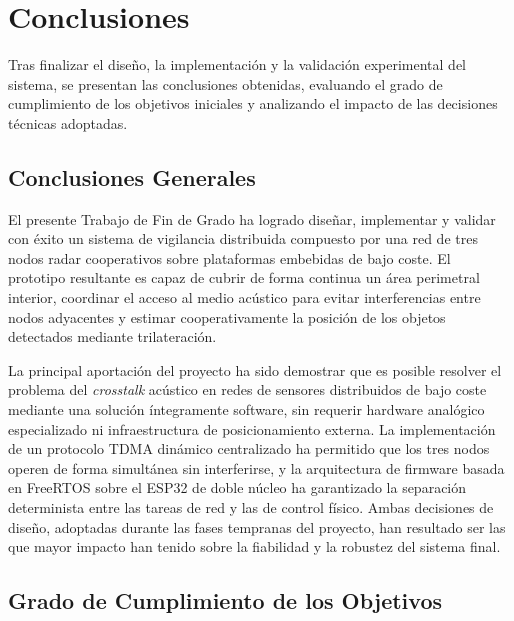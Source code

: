 \chapter{Conclusiones}
\label{chap:conclusiones}

Tras finalizar el diseño, la implementación y la validación experimental del sistema, se presentan las conclusiones obtenidas, evaluando el grado de cumplimiento de los objetivos iniciales y analizando el impacto de las decisiones técnicas adoptadas.

\section{Conclusiones Generales}

El presente Trabajo de Fin de Grado ha logrado diseñar, implementar y validar con éxito un sistema de vigilancia distribuida compuesto por una red de tres nodos radar cooperativos sobre plataformas embebidas de bajo coste. El prototipo resultante es capaz de cubrir de forma continua un área perimetral interior, coordinar el acceso al medio acústico para evitar interferencias entre nodos adyacentes y estimar cooperativamente la posición de los objetos detectados mediante trilateración.

La principal aportación del proyecto ha sido demostrar que es posible resolver el problema del \textit{crosstalk} acústico en redes de sensores distribuidos de bajo coste mediante una solución íntegramente software, sin requerir hardware analógico especializado ni infraestructura de posicionamiento externa. La implementación de un protocolo TDMA dinámico centralizado ha permitido que los tres nodos operen de forma simultánea sin interferirse, y la arquitectura de firmware basada en FreeRTOS sobre el ESP32 de doble núcleo ha garantizado la separación determinista entre las tareas de red y las de control físico. Ambas decisiones de diseño, adoptadas durante las fases tempranas del proyecto, han resultado ser las que mayor impacto han tenido sobre la fiabilidad y la robustez del sistema final.

\section{Grado de Cumplimiento de los Objetivos}

